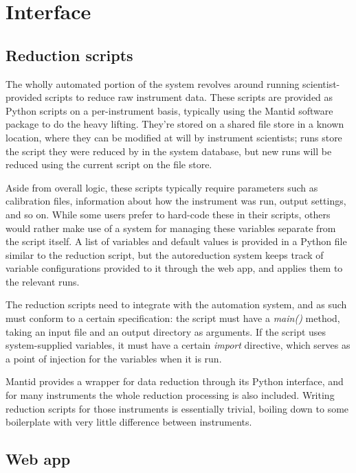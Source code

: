 \documentclass[twocolumn]{article}
\begin{document}
\section{Interface}\label{interface}

\subsection{Reduction scripts}\label{reduction-scripts}

The wholly automated portion of the system revolves around running
scientist-provided scripts to reduce raw instrument data. These scripts
are provided as Python scripts on a per-instrument basis, typically
using the Mantid software package to do the heavy lifting. They're
stored on a shared file store in a known location, where they can be
modified at will by instrument scientists; runs store the script they
were reduced by in the system database, but new runs will be reduced
using the current script on the file store.

Aside from overall logic, these scripts typically require parameters
such as calibration files, information about how the instrument was run,
output settings, and so on. While some users prefer to hard-code these
in their scripts, others would rather make use of a system for managing
these variables separate from the script itself. A list of variables and
default values is provided in a Python file similar to the reduction
script, but the autoreduction system keeps track of variable
configurations provided to it through the web app, and applies them to
the relevant runs.

The reduction scripts need to integrate with the automation system, and
as such must conform to a certain specification: the script must have a
\emph{main()} method, taking an input file and an output directory as
arguments. If the script uses system-supplied variables, it must have a
certain \emph{import} directive, which serves as a point of injection
for the variables when it is run.

Mantid provides a wrapper for data reduction through its Python
interface, and for many instruments the whole reduction processing is
also included. Writing reduction scripts for those instruments is
essentially trivial, boiling down to some boilerplate with very little
difference between instruments.

\subsection{Web app}\label{web-app}
\end{document}
